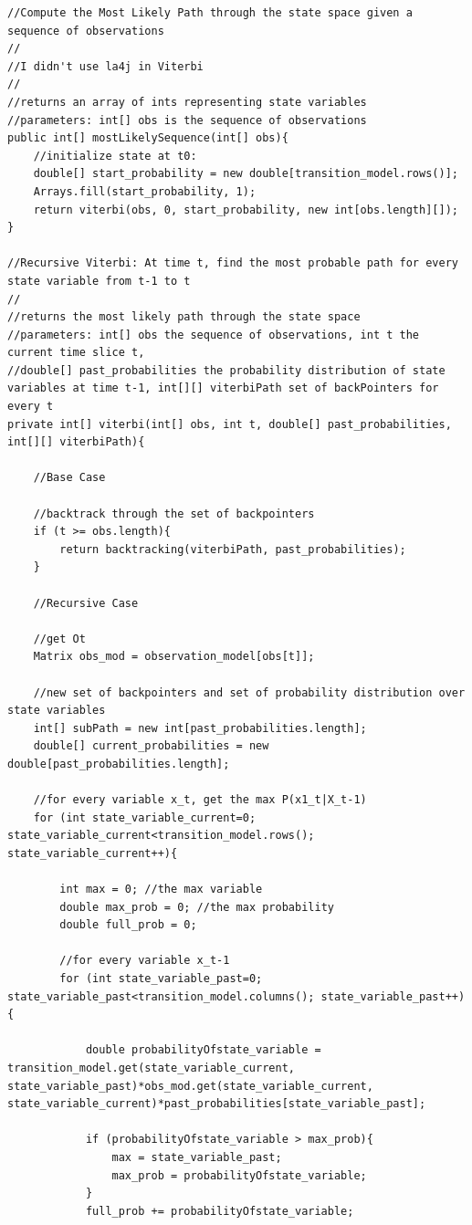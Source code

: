 \documentclass[a4paper]{article}
\begin{document}
\lstset{
numbers=left
}
\begin{lstlisting}
//Compute the Most Likely Path through the state space given a sequence of observations
//
//I didn't use la4j in Viterbi
//
//returns an array of ints representing state variables
//parameters: int[] obs is the sequence of observations
public int[] mostLikelySequence(int[] obs){
	//initialize state at t0: 
	double[] start_probability = new double[transition_model.rows()];
	Arrays.fill(start_probability, 1);
	return viterbi(obs, 0, start_probability, new int[obs.length][]);
}

//Recursive Viterbi: At time t, find the most probable path for every state variable from t-1 to t
//
//returns the most likely path through the state space
//parameters: int[] obs the sequence of observations, int t the current time slice t,
//double[] past_probabilities the probability distribution of state variables at time t-1, int[][] viterbiPath set of backPointers for every t
private int[] viterbi(int[] obs, int t, double[] past_probabilities, int[][] viterbiPath){
	
	//Base Case
	
	//backtrack through the set of backpointers
	if (t >= obs.length){
		return backtracking(viterbiPath, past_probabilities);
	}
	
	//Recursive Case
	
	//get Ot
	Matrix obs_mod = observation_model[obs[t]];
	
	//new set of backpointers and set of probability distribution over state variables
	int[] subPath = new int[past_probabilities.length];
	double[] current_probabilities = new double[past_probabilities.length];
	
	//for every variable x_t, get the max P(x1_t|X_t-1)
	for (int state_variable_current=0; state_variable_current<transition_model.rows(); state_variable_current++){
		
		int max = 0; //the max variable
		double max_prob = 0; //the max probability
		double full_prob = 0;
		
		//for every variable x_t-1
		for (int state_variable_past=0; state_variable_past<transition_model.columns(); state_variable_past++){
			
			double probabilityOfstate_variable = transition_model.get(state_variable_current, state_variable_past)*obs_mod.get(state_variable_current, state_variable_current)*past_probabilities[state_variable_past];
							
			if (probabilityOfstate_variable > max_prob){
				max = state_variable_past;
				max_prob = probabilityOfstate_variable;
			}
			full_prob += probabilityOfstate_variable;


\end{lstlisting}
\end{document}
